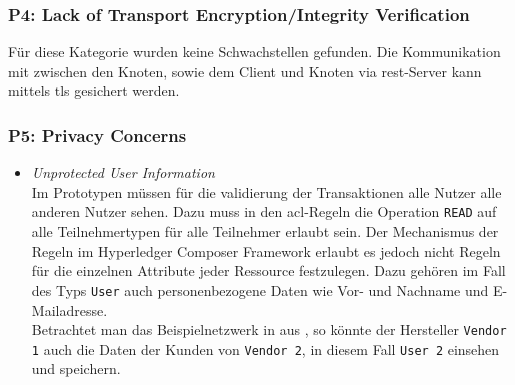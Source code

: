         \subsubsection*{P4: Lack of Transport Encryption/Integrity Verification}
            Für diese Kategorie wurden keine Schwachstellen gefunden. 
            Die Kommunikation mit zwischen den Knoten, sowie dem Client und Knoten via \gls{rest}-Server kann mittels \gls{tls} gesichert werden.
            
        \subsubsection*{P5: Privacy Concerns}
            \begin{itemize}[leftmargin=0cm,label={}]
                \item \emph{Unprotected User Information}\label{vuln:prototype_userdata}\\
                    Im Prototypen müssen für die validierung der Transaktionen alle Nutzer alle anderen Nutzer sehen. 
                    Dazu muss in den \gls{acl}-Regeln die Operation \colorbox{light-gray}{\lstinline{READ}} auf alle Teilnehmertypen für alle Teilnehmer erlaubt sein. 
                    Der Mechanismus der Regeln im Hyperledger Composer Framework erlaubt es jedoch nicht Regeln für die einzelnen Attribute jeder Ressource festzulegen. 
                    Dazu gehören im Fall des Typs \colorbox{light-gray}{\lstinline{User}} auch personenbezogene Daten wie Vor- und Nachname und E-Mailadresse.\\
                    Betrachtet man das Beispielnetzwerk in  aus , so könnte der Hersteller \colorbox{light-gray}{\lstinline{Vendor 1}} auch die Daten der Kunden von \colorbox{light-gray}{\lstinline{Vendor 2}}, in diesem Fall \colorbox{light-gray}{\lstinline{User 2}} einsehen und speichern.
            \end{itemize}
            
